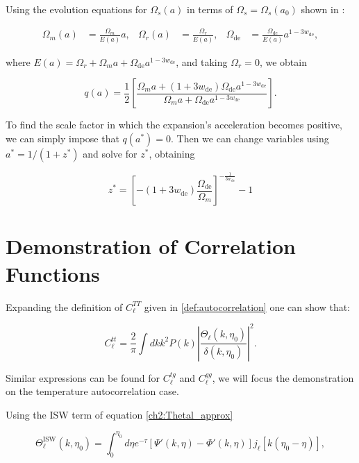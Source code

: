 \documentclass[openany,a4paper,12pt,oneside]{book}
\begin{document}
\begin{spacing}{1.5}
Using the evolution equations for $\Omega_s(a)$ in terms of $\Omega_s=\Omega_s(a_0)$ shown in \cite{dark_energy_era}:

\begin{align}\label{evolution_eqs}
	\Omega_m(a)&=\frac{\Omega_m}{E(a)}a, & \Omega_r(a)&=\frac{\Omega_r}{E(a)}, & \Omega_\text{de}&=\frac{\Omega_\text{de}}{E(a)}a^{1-3w_\text{de}},
\end{align}

\noindent where $E(a)=\Omega_r+\Omega_m a +\Omega_\text{de}a^{1-3w_\text{de}}$, and taking $\Omega_r=0$, we obtain

\begin{equation}\label{app_DE:step4}
	q(a)=\frac{1}{2}\left[\frac{\Omega_m a+(1+3w_\text{de})\Omega_\text{de}a^{1-3w_\text{de}}}{\Omega_m a +\Omega_\text{de}a^{1-3w_\text{de}}}\right].
\end{equation}

To find the scale factor in which the expansion's acceleration becomes positive, we can simply impose that $q(a^*)=0$. Then we can change variables using $a^*=1/(1+z^*)$ and solve for $z^*$, obtaining

\begin{equation}
	z^*=\left[-(1+3w_\text{de})\frac{\Omega_\text{de}}{\Omega_m}\right]^{-\frac{1}{3w_\text{de}}}-1
\end{equation}

\chapter{Demonstration of Correlation Functions}\label{app:correlations_demo}

Expanding the definition of $C_\ell^{TT}$ given in \eqref{def:autocorrelation} one can show that\cite{dodelson2020modern}:

\begin{equation}\label{demo:Start_eq}
	C_\ell^{tt}=\frac{2}{\pi}\int dk k^2P(k)\left|\frac{\Theta_\ell(k,\eta_0)}{\delta(k,\eta_0)}\right|^2.
\end{equation}

Similar expressions can be found for $C_\ell^{tg}$ and $C_\ell^{gg}$, we will focus the demonstration on the temperature autocorrelation case.

Using the ISW term of equation \eqref{ch2:Thetal_approx}

\begin{equation}
	\Theta_\ell^{\text{ISW}}(k,\eta_0)=\int_0^{\eta_0} d\eta e^{-\tau}[\Psi'(k,\eta)-\Phi'(k,\eta)]j_\ell[k(\eta_0-\eta)],
\end{equation}


\end{spacing}
\end{document}
